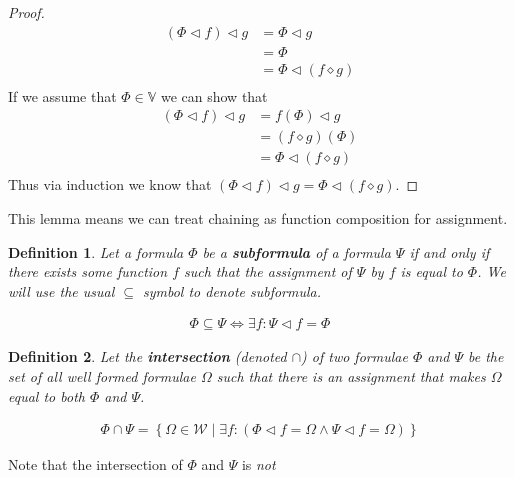 \documentclass{article}
\newtheorem{defin}{Definition}
\begin{document}
\begin{proof}
\begin{align*}
(\Phi \lhd f) \lhd g &= \Phi \lhd g              \tag{Definition of Assignment} \\
                     &= \Phi                     \tag{Definition of Assignment} \\
                     &= \Phi \lhd (f \diamond g) \tag{Definition of Assignment} \\
\end{align*}
If we assume that $\Phi \in \mathbb{V}$ we can show that
\begin{align*}
(\Phi \lhd f) \lhd g &= f(\Phi) \lhd g           \tag{Definition of Assignment} \\
                     &= (f \diamond g) (\Phi)    \tag{Definition of Assignment} \\
                     &= \Phi \lhd (f \diamond g) \tag{Definition of Chain} \\
\end{align*}
Thus via induction we know that $(\Phi\lhd f)\lhd g=\Phi\lhd(f\diamond g)$.
\end{proof}

This lemma means we can treat chaining as function composition for assignment.

\begin{defin}
Let a formula $\Phi$ be a \textbf{subformula} of a formula $\Psi$
if and only if there exists some function $f$ such that the assignment of $\Psi$ by $f$ is equal to $\Phi$.
We will use the usual $\subseteq$ symbol to denote subformula.

\begin{align*}
\Phi \subseteq \Psi \iff \exists f: \Psi \lhd f = \Phi
\end{align*}
\end{defin}

\begin{defin}
Let the \textbf{intersection} (denoted $\cap$) of two formulae $\Phi$ and $\Psi$ be
the set of all well formed formulae $\Omega$ such that there is an assignment that makes $\Omega$ equal to both $\Phi$ and $\Psi$.

\begin{align*}
\Phi \cap \Psi = \left\{\Omega \in \mathcal{W} \mid \exists f: (\Phi \lhd f = \Omega \land \Psi \lhd f = \Omega)\right\}
\end{align*}
\end{defin}

Note that the intersection of $\Phi$ and $\Psi$ is \textit{not}
\end{document}
